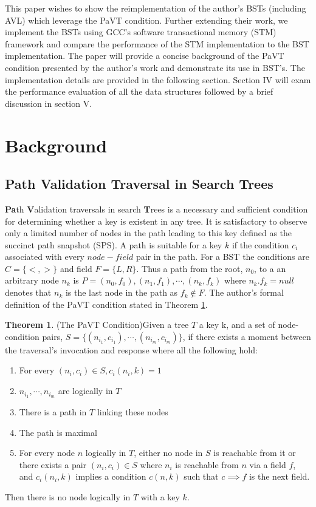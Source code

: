 \documentclass[conference]{IEEEtran}
\theoremstyle{definition}
\theoremstyle{theorem}
\newtheorem{theorem}{Theorem}[section]
\begin{document}
This paper wishes to show the reimplementation of the author's BSTs (including AVL) which leverage the PaVT condition. Further extending their work, we implement the BSTs using GCC's software transactional memory (STM) framework and compare the performance of the STM implementation to the BST implementation. The paper will provide a concise background of the PaVT condition presented by the author's work and demonstrate its use in BST's. The implementation details are provided in the following section. Section IV will exam the performance evaluation of all the data structures followed by a brief discussion in section V.
\section{Background}
\subsection{Path Validation Traversal in Search Trees}
\textbf{Pa}th \textbf{V}alidation traversals in search \textbf{T}rees is a necessary and sufficient condition for determining whether a key is existent in any tree. It is satisfactory to observe only a limited number of nodes in the path leading to this key defined as the succinct path snapshot (SPS). A path is suitable for a key $k$ if the condition $c_i$ associated with every $node-field$ pair in the path. For a BST the conditions are $C=\{<,>\}$ and field $F=\{L, R\}$. Thus a path from the root, $n_0$, to a an arbitrary node $n_k$ is $P=(n_0, f_0), (n_1, f_1),\cdots, (n_k, f_k)$ where $n_k.f_k = null$ denotes that $n_k$ is the last node in the path as $f_k\not \in F$. The author's formal definition of the PaVT condition stated in Theorem \ref{thm:pavt}.

\begin{theorem} {(The PaVT Condition)}\label{thm:pavt}
Given a tree $T$ a key k, and a set of node-condition pairs, $S=\{(n_{i_1}, c_{i_1}),\cdots, (n_{i_m}, c_{i_m})\}$, if there exists a moment between the traversal's invocation and response where all the following hold:
\begin{enumerate}
\item For every $(n_i, c_i) \in  S, c_i(n_i, k) = 1$
\item $n_{i_1},\cdots, n_{i_m}$ are logically in $T$
\item There is a path in $T$ linking these nodes
\item The path is maximal
\item For every node $n$ logically in $T$, either no node in $S$ is reachable from it or there exists a pair $(n_i, c_i)\in S$ where $n_i$ is reachable from $n$ via a field $f$, and $c_i(n_i, k)$ implies a condition $c(n, k)$ such that $c \implies f$ is the next field.
\end{enumerate}
Then there is no node logically in $T$ with a key $k$.
\end{theorem}
\end{document}
